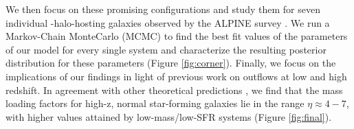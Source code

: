\documentclass[a4paper, 12pt]{article}
\begin{document}
We then focus on these promising configurations and study them for seven individual \CII-halo-hosting galaxies observed by the ALPINE survey \citep{Fujimoto:2020qzo}. We run a Markov-Chain MonteCarlo (MCMC) to find the best fit values of the parameters of our model for every single system and characterize the resulting posterior distribution for these parameters (Figure \ref{fig:corner}). Finally, we focus on the implications of our findings in light of previous work on outflows at low and high redshift. In agreement with other theoretical predictions \citep{Finlator:2007mh, muratov2015}, we find that the mass loading factors for high-z, normal star-forming galaxies lie in the range $\eta\approx 4 - 7$, with higher values attained by low-mass/low-SFR systems (Figure \ref{fig:final}).


 
 
\end{document}
